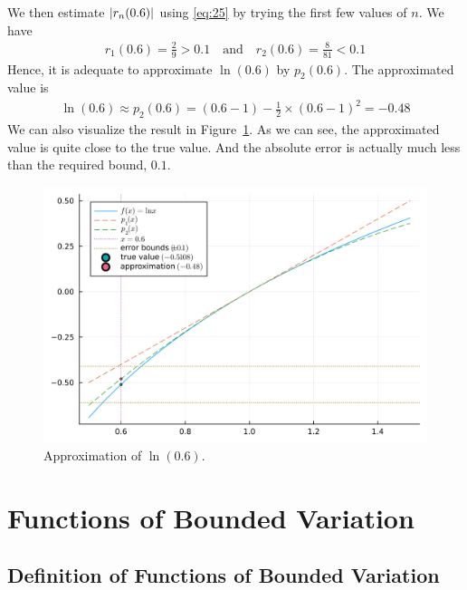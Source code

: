 \documentclass[thmcnt=section, 12pt]{my-elegantbook}
\begin{document}
\begin{solution}
    \par We then estimate $\left\lvert r_n(0.6) \right\rvert$ using \eqref{eq:25} by trying the first few values of $n$. We have
    \begin{align*}
        r_1(0.6) = \frac{2}{9} > 0.1
        \quad \text{and} \quad
        r_2(0.6) = \frac{8}{81} < 0.1
    \end{align*}
    Hence, it is adequate to approximate $\ln(0.6)$ by $p_2(0.6)$. The approximated value is
    \begin{align*}
        \ln(0.6) \approx p_2(0.6) = (0.6-1) - \frac{1}{2} \times (0.6-1)^2 = -0.48
    \end{align*}
    We can also visualize the result in Figure~\ref{fig:8}. As we can see, the approximated value is quite close to the true value. And the absolute error is actually much less than the required bound, $0.1$.
    \begin{figure}[ht]
        \centering
        \includegraphics[scale=0.2]{figures/taylor-approx.png}
        \caption{Approximation of $\ln(0.6)$.}
        \label{fig:8}
    \end{figure}
\end{solution}


\chapter{Functions of Bounded Variation}


\section{Definition of Functions of Bounded Variation}
\end{document}
